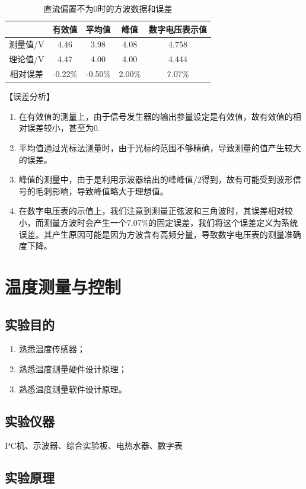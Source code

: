 \documentclass[12pt]{article}
\begin{document}
\begin{table}[htbp]
  \centering
  \caption{直流偏置不为0时的方波数据和误差}
    \begin{tabular}{|c|c|c|c|c|}
    \hline
      & 有效值 & 平均值 & 峰值 & 数字电压表示值  \\
    \hline
    测量值/V & 4.46  & 3.98  & 4.08  & 4.758   \\
    \hline
    理论值/V & 4.47  & 4.00  & 4.00  & 4.444   \\
    \hline
    相对误差 & -0.22\% & -0.50\% & 2.00\% & 7.07\%  \\
    \hline
    \end{tabular}%
  \label{tab:dycl4}%
\end{table}%
【误差分析】
\begin{enumerate}
  \item 在有效值的测量上，由于信号发生器的输出参量设定是有效值，故有效值的相对误差较小，甚至为0.
\item 平均值通过光标法测量时，由于光标的范围不够精确，导致测量的值产生较大的误差。
\item 峰值的测量中，由于是利用示波器给出的峰峰值/2得到，故有可能受到波形信号的毛刺影响，导致峰值略大于理想值。
\item 在数字电压表的示值上，我们注意到测量正弦波和三角波时，其误差相对较小，而测量方波时会产生一个7.07\%的固定误差，我们将这个误差定义为系统误差。其产生原因可能是因为方波含有高频分量，导致数字电压表的测量准确度下降。
\end{enumerate}

\newpage
\section{温度测量与控制}
\setcounter{equation}{0}
\setcounter{table}{0}
\setcounter{figure}{0}
\subsection{实验目的}
\begin{enumerate}
  \item 熟悉温度传感器；
\item 熟悉温度测量硬件设计原理；
\item 熟悉温度测量软件设计原理。
\end{enumerate}
\subsection{实验仪器}
PC机、示波器、综合实验板、电热水器、数字表
\subsection{实验原理}
\end{document}
